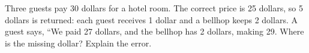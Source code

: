 Three guests pay 30 dollars for a hotel room. The correct price is 25 dollars, so 5 dollars is returned: each guest receives 1 dollar and a bellhop keeps 2 dollars. A guest says, ``We paid 27 dollars, and the bellhop has 2 dollars, making 29. Where is the missing dollar? Explain the error.

